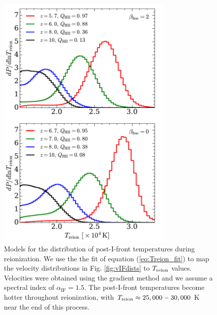 \documentclass[twocolumn]{aastex62}
\newcommand{\Treion}{T_{\rm reion}}
\newcommand{\spec}{\alpha_{\mathrm{IF}}}
\begin{document}
\begin{figure}
\includegraphics[width=8.5cm]{fig8.pdf}
\caption{Models for the distribution of post-I-front temperatures during reionization.  We use the the fit of equation (\ref{eq:Treion_fit}) to map the velocity distributions in Fig. \ref{fig:vIFdists} to $\Treion$ values.  Velocities were obtained using the gradient method and we assume a spectral index of $\spec=1.5$.  The post-I-front temperatures become hotter throughout reionization, with $\Treion \approx 25,000 - 30,000$ K near the end of this process.}
\label{fig:Treiondists}
\end{figure}
\end{document}
